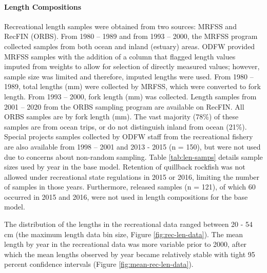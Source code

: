 \documentclass[11pt,
  english,
  a4paper,
]{article}
\begin{document}
\leavevmode\tagmcend\tagstructend\par


\hypertarget{length-compositions-1}{%
\paragraph{Length Compositions}\label{length-compositions-1}}

\leavevmode\tagmcend\tagstructend


Recreational length samples were obtained from two sources: MRFSS and RecFIN (ORBS). From 1980 -- 1989 and from 1993 -- 2000, the MRFSS program collected samples from both ocean and inland (estuary) areas. ODFW provided MRFSS samples with the addition of a column that flagged length values imputed from weights to allow for selection of directly measured values; however, sample size was limited and therefore, imputed lengths were used. From 1980 -- 1989, total lengths (mm) were collected by MRFSS, which were converted to fork length. From 1993 -- 2000, fork length (mm) was collected. Length samples from 2001 -- 2020 from the ORBS sampling program are available on RecFIN. All ORBS samples are by fork length (mm). The vast majority (78\%) of these samples are from ocean trips, or do not distinguish inland from ocean (21\%). Special projects samples collected by ODFW staff from the recreational fishery are also available from 1998 -- 2001 and 2013 - 2015 (n = 150), but were not used due to concerns about non-random sampling. Table \ref{tab:len-samps} details sample sizes used by year in the base model. Retention of quillback rockfish was not allowed under recreational state regulations in 2015 or 2016, limiting the number of samples in those years. Furthermore, released samples (n = 121), of which 60 occurred in 2015 and 2016, were not used in length compositions for the base model.

\leavevmode\tagmcend\tagstructend\par


The distribution of the lengths in the recreational data ranged between 20 - 54 cm (the maximum length data bin size, Figure \ref{fig:rec-len-data}). The mean length by year in the recreational data was more variable prior to 2000, after which the mean lengths observed by year became relatively stable with tight 95 percent confidence intervals (Figure \ref{fig:mean-rec-len-data}).
\end{document}
